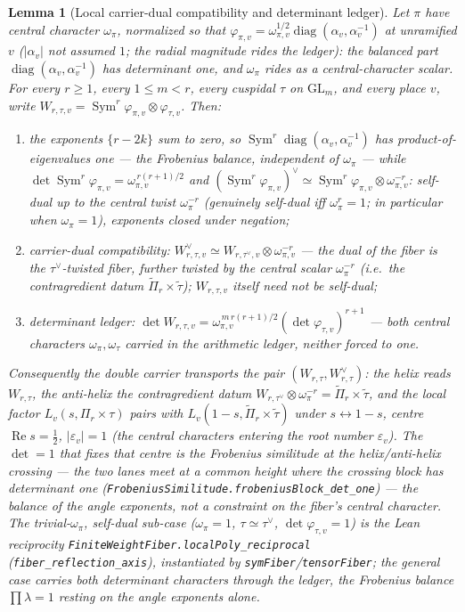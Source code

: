 \documentclass[11pt]{article}
\newtheorem{lemma}[theorem]{Lemma}
\theoremstyle{definition}
\renewcommand{\Re}{\operatorname{Re}}
\newcommand{\Sym}{\operatorname{Sym}}
\begin{document}
\begin{lemma}[Local carrier-dual compatibility and determinant ledger]\label{lem:selfdual}
Let $\pi$ have central character $\omega_\pi$, normalized so that $\varphi_{\pi,v}=\omega_{\pi,v}^{1/2}\operatorname{diag}(\alpha_v,\alpha_v^{-1})$ at unramified $v$ ($|\alpha_v|$ not assumed $1$; the radial magnitude rides the ledger): the balanced part $\operatorname{diag}(\alpha_v,\alpha_v^{-1})$ has determinant one, and
$\omega_\pi$ rides as a central-character scalar. For every $r\ge1$, every $1\le m<r$, every cuspidal $\tau$ on
$\mathrm{GL}_m$, and every place $v$, write $W_{r,\tau,v}=\Sym^r\varphi_{\pi,v}\otimes\varphi_{\tau,v}$. Then:
\begin{enumerate}
\item[\textup{(i)}] the exponents $\{r-2k\}$ sum to zero, so $\Sym^r\operatorname{diag}(\alpha_v,\alpha_v^{-1})$
has product-of-eigenvalues one --- the \emph{Frobenius balance}, independent of $\omega_\pi$ --- while
$\det\Sym^r\varphi_{\pi,v}=\omega_{\pi,v}^{\,r(r+1)/2}$ and $(\Sym^r\varphi_{\pi,v})^\vee\simeq
\Sym^r\varphi_{\pi,v}\otimes\omega_{\pi,v}^{-r}$: self-dual \emph{up to the central twist} $\omega_\pi^{-r}$
(genuinely self-dual iff $\omega_\pi^r=1$; in particular when $\omega_\pi=1$), exponents closed under negation;
\item[\textup{(ii)}] \emph{carrier-dual compatibility}: $W_{r,\tau,v}^\vee\simeq W_{r,\tau^\vee,v}\otimes
\omega_{\pi,v}^{-r}$ --- the dual of the fiber is the $\tau^\vee$-twisted fiber, further twisted by the central
scalar $\omega_\pi^{-r}$ (i.e.\ the contragredient datum $\widetilde\Pi_r\times\widetilde\tau$); $W_{r,\tau,v}$
itself \emph{need not} be self-dual;
\item[\textup{(iii)}] \emph{determinant ledger}: $\det W_{r,\tau,v}=\omega_{\pi,v}^{\,m\,r(r+1)/2}
(\det\varphi_{\tau,v})^{r+1}$ --- \emph{both} central characters $\omega_\pi,\omega_\tau$ carried in the
arithmetic ledger, neither forced to one.
\end{enumerate}
Consequently the double carrier transports the \emph{pair} $(W_{r,\tau},W_{r,\tau}^\vee)$: the helix reads
$W_{r,\tau}$, the anti-helix the contragredient datum $W_{r,\tau^\vee}\otimes\omega_\pi^{-r}=
\widetilde\Pi_r\times\widetilde\tau$, and the local factor $L_v(s,\Pi_r\times\tau)$ pairs with
$L_v(1-s,\widetilde\Pi_r\times\widetilde\tau)$ under $s\leftrightarrow1-s$, centre $\Re s=\tfrac12$,
$|\varepsilon_v|=1$ (the central characters entering the root number $\varepsilon_v$). The $\det=1$ that fixes
that centre is the \emph{Frobenius similitude at the helix/anti-helix crossing} --- the two lanes meet at a common
height where the crossing block has determinant one (\texttt{FrobeniusSimilitude.frobeniusBlock\_det\_one}) ---
the balance of the angle exponents, not a constraint on the fiber's central character. The trivial-$\omega_\pi$,
self-dual sub-case ($\omega_\pi=1$, $\tau\simeq\tau^\vee$, $\det\varphi_{\tau,v}=1$) is the Lean reciprocity
\texttt{FiniteWeightFiber.localPoly\_reciprocal} (\texttt{fiber\_reflection\_axis}), instantiated by
\texttt{symFiber}/\texttt{tensorFiber}; the general case carries both determinant characters through the ledger,
the Frobenius balance $\prod\lambda=1$ resting on the angle exponents alone.
\end{lemma}
\end{document}
